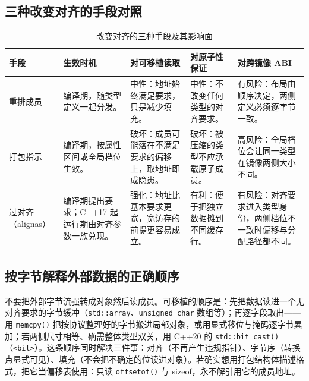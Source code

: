 \documentclass[12pt,a4paper,fontset=fandol]{ctexbook}
\newcommand{\cpp}[1]{C++#1}
\newcommand{\Fn}[1]{\texttt{#1()}}
\newcommand{\Tp}[1]{\texttt{#1}}
\newcommand{\Lang}[1]{\textsf{#1}}
\newcommand{\Hdr}[1]{\texttt{<#1>}}
\begin{document}
\subsection{三种改变对齐的手段对照}\label{sec:ub07-compare}

\begin{table}[htbp]
\centering
\begin{tabular}{>{\raggedright\arraybackslash}p{}>{\raggedright\arraybackslash}p{}>{\raggedright\arraybackslash}p{}>{\raggedright\arraybackslash}p{}>{\raggedright\arraybackslash}p{}}
\toprule
手段 & 生效时机 & 对可移植读取 & 对原子性保证 & 对跨镜像 ABI \\
\midrule
重排成员 &
  编译期，随类型定义一起分发。 &
  中性：地址始终满足要求，只是减少填充。 &
  中性：不改变任何类型的对齐要求。 &
  有风险：布局由顺序决定，两侧定义必须逐字节一致。 \\
打包指示 &
  编译期，按属性区间或全局档位生效。 &
  破坏：成员可能落在不满足要求的偏移上，取地址即成隐患。 &
  破坏：被压缩的类型不应承载原子成员。 &
  高风险：全局档位会让同一类型在镜像两侧大小不同。 \\
过对齐（\Lang{alignas}） &
  编译期提出要求；\cpp{17} 起运行期由对齐参数一族兑现。 &
  强化：地址比基本要求更宽，宽访存的前提更容易成立。 &
  有利：便于把独立数据摊到不同缓存行。 &
  有风险：对齐要求进入类型身份，两侧档位不一致时偏移与分配路径都不同。 \\
\bottomrule
\end{tabular}
\caption{改变对齐的三种手段及其影响面}
\label{tab:ub07-means}
\end{table}

\subsection{按字节解释外部数据的正确顺序}\label{sec:ub07-raw-bytes}

\begin{bestpractice}[title={先读进无对齐要求的字节缓冲，再逐字段构造对象}]
不要把外部字节流强转成对象然后读成员。可移植的顺序是：先把数据读进一个无对齐要求的字节缓冲（\Tp{std::array}、\Tp{unsigned char} 数组等）；再逐字段取出——用 \Fn{memcpy} 把按协议整理好的字节搬进局部对象，或用显式移位与掩码逐字节累加；若两侧尺寸相等、确需整体类型双关，用 \cpp{20} 的 \Fn{std::bit\_cast}（\Hdr{bit}）。这条顺序同时解决三件事：对齐（不再产生违规指针）、字节序（转换点显式可见）、填充（不会把不确定的位读进对象）。若确实想用打包结构体描述格式，把它当偏移表使用：只读 \Fn{offsetof} 与 \Lang{sizeof}，永不解引用它的成员地址。
\end{bestpractice}
\end{document}
